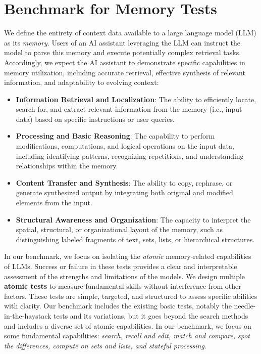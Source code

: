 \section{Benchmark for Memory Tests}

We define the entirety of context data available to a large language model (LLM) as its \textit{memory}. Users of an AI assistant leveraging the LLM can instruct the model to parse this memory and execute potentially complex retrieval tasks. Accordingly, we expect the AI assistant to demonstrate specific capabilities in memory utilization, including accurate retrieval, effective synthesis of relevant information, and adaptability to evolving context:
%
\begin{itemize}
    \item \textbf{Information Retrieval and Localization}: The ability to efficiently locate, search for, and extract relevant information from the memory (i.e., input data) based on specific instructions or user queries.
    \item \textbf{Processing and Basic Reasoning}: The capability to perform modifications, computations, and logical operations on the input data, including identifying patterns, recognizing repetitions, and understanding relationships within the memory.
    \item \textbf{Content Transfer and Synthesis}: The ability to copy, rephrase, or generate synthesized output by integrating both original and modified elements from the input.
    \item \textbf{Structural Awareness and Organization}: The capacity to interpret the spatial, structural, or organizational layout of the memory, such as distinguishing labeled fragments of text, sets, lists, or hierarchical structures. 
\end{itemize}

In our benchmark, we focus on isolating the \textit{atomic} memory-related capabilities of LLMs. Success or failure in these tests provides a clear and interpretable assessment of the strengths and limitations of the models. We design multiple \textbf{atomic tests} to measure fundamental skills without interference from other factors. These tests are simple, targeted, and structured to assess specific abilities with clarity. Our benchmark includes the existing basic tests, notably the needle-in-the-haystack tests and its variations, but it goes beyond the search methods and includes a diverse set of atomic capabilities. In our benchmark, we focus on some fundamental capabilities: \textit{search, recall and edit, match and compare, spot the differences, compute on sets and lists, and stateful processing}. 

